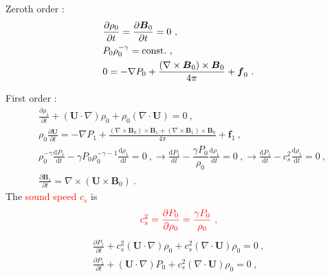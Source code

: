 \documentclass[12pt,a4paper]{article}
\renewcommand{\vec}[1]{\boldsymbol{#1}}
\newcommand{\dif}{\mathrm{d}}
\begin{document}
Zeroth order :
\begin{align*}
& \frac{\partial \rho_0}{\partial t} = \frac{\partial \vec{B}_0}{\partial t} = 0 ~, \\
& P_0 \rho_0^{-\gamma}  = {\rm const.} ~, \\
& 0= -\nabla P_0 +\frac{(\nabla \times \vec{B}_0) \times \vec{B}_0 }{4\pi} + \vec{f}_0 ~.\\
\end{align*}

First order :
\begin{align*}
& \frac{\partial \rho_1}{\partial t} +(\vec{U}\cdot \nabla)\rho_0 +\rho_0(\nabla \cdot \vec{U}) = 0 ~, \\
& \rho_0 \frac{\partial \vec{U}}{\partial t} = -\nabla P_1 +\frac{(\nabla \times \vec{B}_0) \times \vec{B}_1 +(\nabla \times \vec{B}_1) \times \vec{B}_0}{4\pi} + \vec{f}_1 ~,\\
& \rho_0^{-\gamma} \frac{\dif P_1}{\dif t} -\gamma P_0  \rho_0^{-\gamma-1} \frac{\dif \rho_1}{\dif t} = 0 ~, \rightarrow \frac{\dif P_1}{\dif t} -\dfrac{\gamma P_0}{\rho_0} \frac{\dif \rho_1}{\dif t} = 0 ~, \rightarrow \frac{\dif P_1}{\dif t} -c_s^2 \frac{\dif \rho_1}{\dif t} = 0 ~, \\
& \frac{\partial \vec{B}_1}{\partial t} = \nabla \times (\vec{U} \times \vec{B}_0) ~.
\end{align*}
The \textcolor{red}{sound speed $c_s$} is
\begin{equation}
\color{red} c_s^2 = \dfrac{\partial P_0}{\partial \rho_0} = \frac{\gamma P_0}{\rho_0} ~,
\end{equation}
\begin{align}
\nonumber \frac{\partial P_1}{\partial t} +c_s^2(\vec{U}\cdot \nabla)\rho_0 +c_s^2 (\nabla \cdot \vec{U}) \rho_0 = 0 ~, \\
\frac{\partial P_1}{\partial t} +(\vec{U}\cdot \nabla)P_0 +c_s^2 (\nabla \cdot \vec{U}) \rho_0 = 0 ~,
\end{align}
\end{document}
